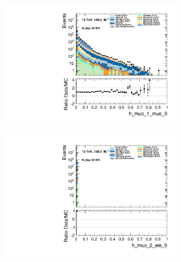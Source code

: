 \begin{figure}
\begin{subfigure}{.49\textwidth}
        \includegraphics[width=\textwidth]{Figures/MC_Data_comp/h_muo_1_muo_0.pdf}
        \caption{ }
        \label{fig:fep}
    \end{subfigure}
    \hfill
    \begin{subfigure}{.49\textwidth}
        \includegraphics[width=\textwidth]{Figures/MC_Data_comp/h_muo_2_ele_0.pdf}
        \caption{ }
        \label{fig:fe}
    \end{subfigure}
    \hfill       
    \caption{}
    \label{fig:t}
\end{figure}

